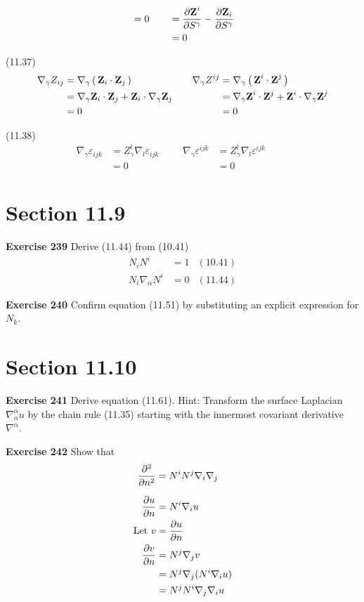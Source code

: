 \documentclass[12pt,a4paper]{report}
\newcommand{\BLUE}[1]{\textcolor{blue}{#1}}
\begin{document}
\begin{description}
{\begin{description}
\begin{align*}
	&=0 &
		&&  &= \frac{\partial \textbf{Z}^i}{\partial S^\gamma}  - \frac{\partial \textbf{Z}_i}{\partial S^\gamma} \\ & & && &= 0
	\end{align*}
	\item (11.37)
	\begin{align*}
		\nabla_\gamma Z_{ij} &= \nabla_\gamma \left (\, \textbf{Z}_i \cdot \textbf{Z}_j \,\right ) & && \nabla_\gamma Z^{ij} &= \nabla_\gamma \left (\, \textbf{Z}^i \cdot \textbf{Z}^j \,\right ) \\
		&= \nabla_\gamma \textbf{Z}_i \cdot \textbf{Z}_j + \textbf{Z}_i \cdot \nabla_\gamma \textbf{Z}_j & && &= \nabla_\gamma \textbf{Z}^i \cdot \textbf{Z}^j + \textbf{Z}^i \cdot \nabla_\gamma \textbf{Z}^j \\
		&= 0 & && &= 0
	\end{align*}
	\item (11.38)
	\begin{align*}
		\nabla_\gamma\varepsilon_{ijk} &= Z_\gamma^l \nabla_l \varepsilon_{ijk} &
		&& \nabla_\gamma\varepsilon^{ijk} &= Z_\gamma^l \nabla_l \varepsilon^{ijk} & && \\
		&= 0 & && &= 0
	\end{align*}
\end{description}
}

\section*{Section 11.9}
\item \textbf{Exercise 239} Derive (11.44) from (10.41)
\begin{align*}
	N_iN^i &= 1 & (10.41) \\
	N_i\nabla_\alpha N^i &= 0 & (11.44)
\end{align*}

\item \textbf{Exercise 240} Confirm equation (11.51) by substituting an explicit expression for $N_k$.
\section*{Section 11.10} 
\item \textbf{Exercise 241} Derive equation (11.61). Hint: Transform the surface Laplacian $\nabla_\alpha^\alpha u$ by the chain rule (11.35) starting with the innermost covariant derivative $\nabla^\alpha$.
\item \textbf{Exercise 242} Show that 
\begin{align*}
	\frac{\partial^2 }{\partial n^2} &= N^iN^j\nabla_i\nabla_j
\end{align*}
	
	\BLUE{\begin{align*}
			\frac{\partial u}{\partial n} &= N^i\nabla_i u \\
			\text{Let } v &= \frac{\partial u}{\partial n}\\
			\frac{\partial v}{\partial n} &= N^j\nabla_j v \\
				&= N^j \nabla_j (N^i\nabla_i u) \\
				&= N^jN^i \nabla_j\nabla_i u
		\end{align*}	
	}\end{description}
\end{document}
